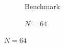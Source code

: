 \begin{figure}[p]
    \centering
    \begin{subfigure}[b]{0.49\textwidth}
	    \caption{Benchmark}
    	\label{fig:va}
    \end{subfigure}
    \begin{subfigure}[b]{0.49\textwidth}
	    \caption{$N = 64$}
	    \label{fig:vb}	
    \end{subfigure}
    

\end{figure}
